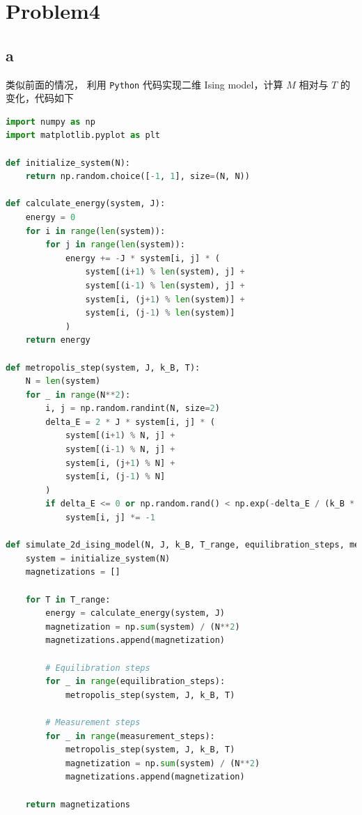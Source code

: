 \documentclass[UTF8]{ctexart}
\begin{document}
    \newpage
    \section{Problem4}\label{sec:4}
    \subsection{a}\label{subsec:4.1}
    类似前面的情况， 利用 \texttt{Python} 代码实现二维 Ising model，计算 \(M\) 相对与 \(T\) 的变化，代码如下
    \begin{lstlisting}[language=Python, breaklines = true,label={lst:4.1}]
import numpy as np
import matplotlib.pyplot as plt

def initialize_system(N):
    return np.random.choice([-1, 1], size=(N, N))

def calculate_energy(system, J):
    energy = 0
    for i in range(len(system)):
        for j in range(len(system)):
            energy += -J * system[i, j] * (
                system[(i+1) % len(system), j] +
                system[(i-1) % len(system), j] +
                system[i, (j+1) % len(system)] +
                system[i, (j-1) % len(system)]
            )
    return energy

def metropolis_step(system, J, k_B, T):
    N = len(system)
    for _ in range(N**2):
        i, j = np.random.randint(N, size=2)
        delta_E = 2 * J * system[i, j] * (
            system[(i+1) % N, j] +
            system[(i-1) % N, j] +
            system[i, (j+1) % N] +
            system[i, (j-1) % N]
        )
        if delta_E <= 0 or np.random.rand() < np.exp(-delta_E / (k_B * T)):
            system[i, j] *= -1

def simulate_2d_ising_model(N, J, k_B, T_range, equilibration_steps, measurement_steps):
    system = initialize_system(N)
    magnetizations = []

    for T in T_range:
        energy = calculate_energy(system, J)
        magnetization = np.sum(system) / (N**2)
        magnetizations.append(magnetization)

        # Equilibration steps
        for _ in range(equilibration_steps):
            metropolis_step(system, J, k_B, T)

        # Measurement steps
        for _ in range(measurement_steps):
            metropolis_step(system, J, k_B, T)
            magnetization = np.sum(system) / (N**2)
            magnetizations.append(magnetization)

    return magnetizations


\end{lstlisting}
\end{document}

